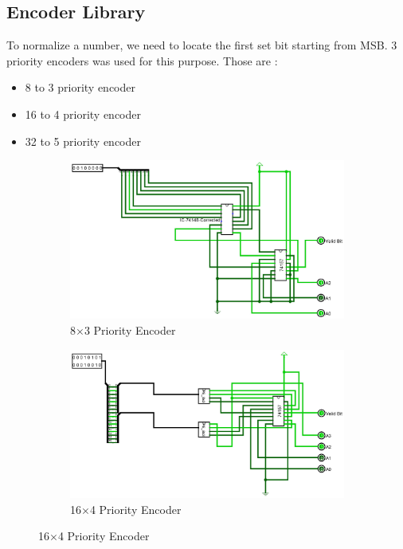 \documentclass[12pt]{article}
\begin{document}
\subsection{Encoder Library}
To normalize a number, we need to locate the first set bit starting from MSB. 3 priority encoders was used for this purpose. Those are :
\begin{itemize}
    \item 8 to 3 priority encoder 
    \item 16 to 4 priority encoder 
    \item 32 to 5 priority encoder 
\end{itemize}
\begin{figure}[H]
    \centering
    \begin{subfigure}[b]{0.45\textwidth}
        \includegraphics[width=\textwidth]{PE_8x3.jpg}
        \caption{8$\times$3 Priority Encoder}
        \label{fig:8x3prioenc}
    \end{subfigure}
    \begin{subfigure}[b]{0.45\textwidth}
        \includegraphics[width=\textwidth]{PE_16x4.jpg}
        \caption{16$\times$4 Priority Encoder}

\end{subfigure}
\end{figure}
\end{document}
